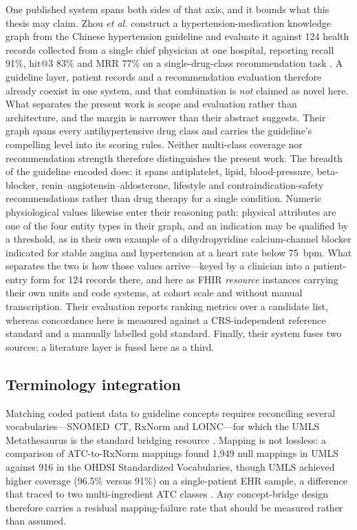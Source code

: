 One published system spans both sides of that axis, and it bounds what this thesis may
claim. Zhou \textit{et al.} construct a hypertension-medication knowledge graph from the
Chinese hypertension guideline and evaluate it against 124 health records
collected from a single chief physician at one hospital, reporting recall
91\%, hit@3 83\% and MRR 77\% on a single-drug-class recommendation task \cite{zhou2022}.
A guideline layer, patient records and a recommendation evaluation therefore already
coexist in one system, and that combination is \emph{not} claimed as novel here. What
separates the present work is scope and evaluation rather than architecture, and the
margin is narrower than their abstract suggests. Their graph spans every antihypertensive
drug class and carries the guideline's compelling level into its scoring rules. Neither
multi-class coverage nor recommendation strength therefore distinguishes the present work.
The breadth of the guideline encoded does: it spans antiplatelet, lipid, blood-pressure,
beta-blocker, renin--angiotensin--aldosterone, lifestyle and contraindication-safety
recommendations rather than drug therapy for a single condition. Numeric physiological
values likewise enter their reasoning path: physical attributes are one of the four entity
types in their graph, and an indication may be qualified by a threshold, as in their own
example of a dihydropyridine calcium-channel blocker indicated for stable angina and
hypertension at a heart rate below 75~bpm. What separates the two is how those values
arrive---keyed by a clinician into a patient-entry form for 124 records there, and here as
FHIR \emph{resource} instances carrying their own units and code systems, at cohort scale
and without manual transcription. Their evaluation reports ranking metrics over a candidate
list, whereas concordance here is measured against a CRS-independent reference
standard and a manually labelled gold standard. Finally, their system fuses two sources; a
literature layer is fused here as a third.

\subsection{Terminology integration}
Matching coded patient data to guideline concepts requires reconciling several
vocabularies---SNOMED~CT, RxNorm and LOINC---for which the UMLS Metathesaurus is the
standard bridging resource \cite{umls}. Mapping is not lossless: a comparison of
ATC-to-RxNorm mappings found 1{,}949 null mappings in UMLS against
916 in the OHDSI Standardized Vocabularies, though UMLS achieved higher
coverage (96.5\% versus 91\%) on a single-patient EHR sample, a difference that
traced to two multi-ingredient ATC classes \cite{degroot2024}. Any concept-bridge
design therefore carries a residual mapping-failure rate that should be measured
rather than assumed.


